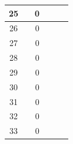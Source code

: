 \begin{table}[]
\begin{tabular}{|c|c|c|c|c|c|}
 			25                                           &                                  & 0                                &                                  &                                  &                                                     \\ \hline
 			26                                           &                                  & 0                                &                                  &                                  &                                                     \\ \hline
 			27                                           &                                  & 0                                &                                  &                                  &                                                     \\ \hline
 			28                                           &                                  & 0                                &                                  &                                  &                                                     \\ \hline
 			29                                           &                                  & 0                                &                                  &                                  &                                                     \\ \hline
 			30                                           &                                  & 0                                &                                  &                                  &                                                     \\ \hline
 			31                                           &                                  & 0                                &                                  &                                  &                                                     \\ \hline
 			32                                           &                                  & 0                                &                                  &                                  &                                                     \\ \hline
 			33                                           &                                  & 0                                &                                  &                                  &                                                     \\ \hline

\end{tabular}
\end{table}

